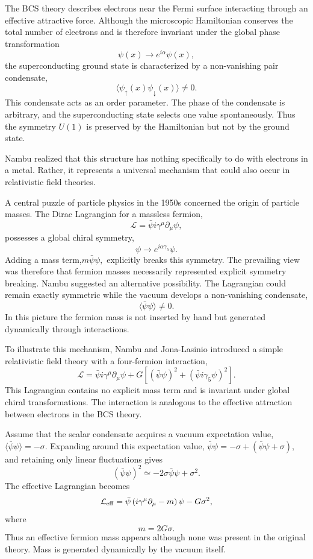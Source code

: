 The BCS theory describes electrons near the Fermi surface interacting
through an effective attractive force. Although the microscopic
Hamiltonian conserves the total number of electrons and is therefore
invariant under the global phase transformation
\[\psi(x) \rightarrow e^{i\alpha}\psi(x),\]
the superconducting ground state is characterized by a non-vanishing
pair condensate,
\[\langle \psi_\uparrow(x) \psi_\downarrow(x) \rangle \neq 0.\]
This condensate acts as an order parameter. The phase of the condensate
is arbitrary, and the superconducting state selects one value
spontaneously.
Thus the symmetry $U(1)$ 
is preserved by the Hamiltonian but not by the ground state.

Nambu realized that this structure has nothing specifically to do with
electrons in a metal. Rather, it represents a universal mechanism that
could also occur in relativistic field theories.

A central puzzle of particle physics in the 1950s concerned the origin
of particle masses.
The Dirac Lagrangian for a massless fermion,
\[\mathcal L=\bar\psi i\gamma^\mu \partial_\mu \psi,\]
possesses a global chiral symmetry,
\[\psi \rightarrow e^{i\alpha\gamma_5}\psi.\]
Adding a mass term,$m\bar\psi\psi,$
explicitly breaks this symmetry. The prevailing view was therefore that
fermion masses necessarily represented explicit symmetry breaking.
Nambu suggested an alternative possibility.
The Lagrangian could remain exactly symmetric while the vacuum develops
a non-vanishing condensate,
\[\boxed{\langle \bar\psi\psi \rangle \neq 0.}\]
In this picture the fermion mass is not inserted by hand but generated
dynamically through interactions.

To illustrate this mechanism, Nambu and Jona-Lasinio introduced a simple
relativistic field theory with a four-fermion interaction,
\[\mathcal L=\bar\psi i\gamma^\mu \partial_\mu \psi +G
\left[(\bar\psi\psi)^2+(\bar\psi i\gamma_5\psi)^2\right].\]
This Lagrangian contains no explicit mass term and is invariant under
global chiral transformations.
The interaction is analogous to the effective attraction between
electrons in the BCS theory.

Assume that the scalar condensate acquires a vacuum expectation value,
$\langle \bar\psi\psi \rangle=-\sigma.$
Expanding around this expectation value,
$\bar\psi\psi=-\sigma+(\bar\psi\psi+\sigma),$
and retaining only linear fluctuations gives
\[(\bar\psi\psi)^2 \simeq -2\sigma \bar\psi\psi +\sigma^2.\]
The effective Lagrangian becomes
\[\mathcal L_{\rm eff}=\bar\psi\left(i\gamma^\mu\partial_\mu
-m\right)\psi-G\sigma^2,\]
where
\[\boxed{m=2G\sigma.}\]
Thus an effective fermion mass appears although none was present in the
original theory.
Mass is generated dynamically by the vacuum itself.

